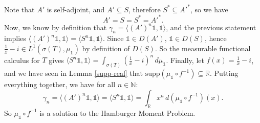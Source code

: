 \documentclass[12pt,oneside]{report}
\begin{document}
Note that $A'$ is self-adjoint, and $A' \subseteq S$, therefore $S^{*} \subseteq A'^{*}$, so we have
$$A' = S = S^{*} = A'^{*}.$$
Now, we know by definition that $\gamma_{n} = \langle (A')^{n}\mathds{1}, \mathds{1} \rangle$, and the previous statement implies $\langle (A')^{n}\mathds{1},\mathds{1} \rangle = \langle S^{n}\mathds{1},\mathds{1}\rangle$. Since $\mathds{1} \in D(A')$, $\mathds{1} \in D(S)$, hence $\frac{1}{x} - i \in L^{1}(\sigma(T),\mu_\mathds{1})$ by definition of $D(S)$. So the measurable functional calculus for $T$ gives $\langle S^{n}\mathds{1},\mathds{1} \rangle = \int _{\sigma(T)} \left( \frac{1}{x} - i \right)^{n} \, d\mu_{\mathds{1}}$. Finally, let $f(x) = \frac{1}{x} - i$, and we have seen in Lemma \ref{supp-real} that $\mathrm{supp}\left( \mu_{\mathds{1}} \circ f^{-1} \right) \subseteq \mathbb{R}$. Putting everything together, we have for all $n \in \mathbb{N}$:
$$\gamma_{n} = \langle (A')^{n}\mathds{1},\mathds{1} \rangle = \langle S^{n}\mathds{1},\mathds{1} \rangle = \int _{\mathbb{R}} x^{n} \, d(\mu_{\mathds{1}} \circ f^{-1})(x).$$
So $\mu_{\mathds{1}} \circ f^{-1}$ is a solution to the Hamburger Moment Problem.



 

\end{document}
